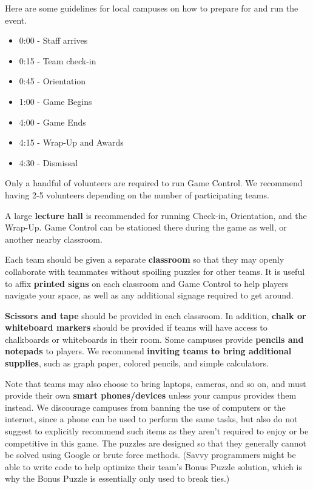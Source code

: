 Here are some guidelines for local campuses on how to prepare for and
run the event.


\begin{itemize}
  \item 0:00 - Staff arrives
  \item 0:15 - Team check-in
  \item 0:45 - Orientation
  \item 1:00 - Game Begins
  \item 4:00 - Game Ends
  \item 4:15 - Wrap-Up and Awards
  \item 4:30 - Dismissal
\end{itemize}


Only a handful of volunteers are required to run Game Control. We recommend
having 2-5 volunteers depending on the number of participating teams.


A large \textbf{lecture hall} is recommended for running Check-in,
Orientation, and the Wrap-Up. Game Control can be stationed there during
the game as well, or another nearby classroom.

Each team should be given a separate \textbf{classroom} so that they may
openly collaborate with teammates without spoiling puzzles for other teams.
It is useful to affix \textbf{printed signs} on each classroom and Game
Control to help players navigate your space, as well as any additional
signage required to get around.


\textbf{Scissors and tape} should be provided in each classroom.
In addition, \textbf{chalk or whiteboard markers} should be provided if
teams will have access to chalkboards or whiteboards in their room.
Some campuses provide \textbf{pencils and notepads} to players.
We recommend \textbf{inviting teams to bring additional supplies}, such as
graph paper, colored pencils, and simple calculators. 

Note that teams may also choose to bring laptops, cameras,
and so on, and must provide their own \textbf{smart phones/devices}
unless your campus provides them instead. 
We discourage campuses from banning the use of computers or the internet,
since a phone can be used to perform the same tasks, but also
do not suggest to explicitly recommend such items as they aren't required
to enjoy or be competitive in this game. The puzzles are
designed so that they generally cannot be solved using Google or 
brute force methods. (Savvy programmers might be able to write code to
help optimize their team's Bonus Puzzle solution, which is why the Bonus
Puzzle is essentially only used to break ties.)

